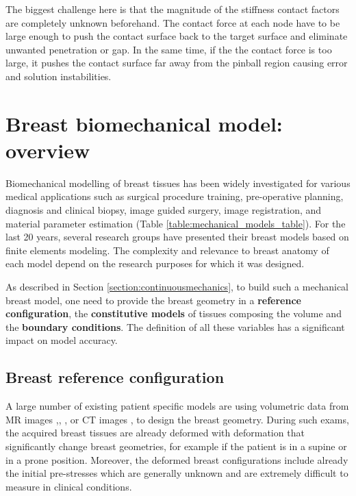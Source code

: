  The biggest challenge here is that the magnitude of the stiffness contact factors are completely unknown beforehand. The contact force at each node have to be large enough to push the contact surface back to the target surface and eliminate unwanted penetration or gap. In the same time, if the the contact force is too large, it pushes the contact surface far away from the pinball region causing error and solution instabilities.

\section{Breast biomechanical model: overview}

Biomechanical modelling of breast tissues has been widely investigated for various medical applications such as surgical procedure training, pre-operative planning, diagnosis and clinical biopsy, image guided surgery, image registration, and material parameter estimation (Table \ref{table:mechanical_models_table}). For the last 20 years, several research groups have presented their breast models based on finite elements modeling.  The complexity and relevance to breast anatomy of each model depend on the research purposes for which it was designed. 
 
As described in Section \ref{section:continuousmechanics}, to build such a mechanical breast model, one need to provide the breast geometry in a \textbf{reference configuration}, the \textbf{constitutive models} of tissues composing the volume and the \textbf{boundary conditions}. The definition of all these variables has a significant impact on model accuracy.

\subsection{Breast reference configuration} 

A large number of existing patient specific models are using volumetric data from MR images \cite{carter_biomechanical_2009},\cite{kellner_simulation_2007}, \cite{conley_realization_2015} \cite{eiben_symmetric_2016}, \cite{martinez_finite_2017}  or CT images \cite{palomar_finite_2008},\cite{sturgeon_finite_element_2016} to design the breast geometry. During such exams, the acquired breast tissues are already deformed with deformation that significantly change breast geometries, for example if the patient is in a supine or in a prone position. Moreover, the deformed breast configurations include already the initial pre-stresses which are generally unknown and are extremely difficult to measure in clinical conditions. 
 

